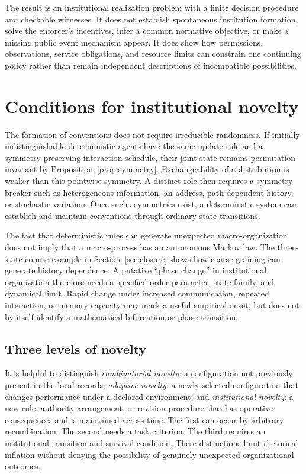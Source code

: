 \documentclass[11pt,letterpaper]{article}
\theoremstyle{plain}
\theoremstyle{definition}
\theoremstyle{remark}
\begin{document}
The result is an institutional realization problem with a finite decision procedure and checkable witnesses. It does not establish spontaneous institution formation, solve the enforcer's incentives, infer a common normative objective, or make a missing public event mechanism appear. It does show how permissions, observations, service obligations, and resource limits can constrain one continuing policy rather than remain independent descriptions of incompatible possibilities.
\FloatBarrier

\section{Conditions for institutional novelty}\label{sec:novelty}

The formation of conventions does not require irreducible randomness. If initially indistinguishable deterministic agents have the same update rule and a symmetry-preserving interaction schedule, their joint state remains permutation-invariant by Proposition~\ref{prop:symmetry}. Exchangeability of a distribution is weaker than this pointwise symmetry. A distinct role then requires a symmetry breaker such as heterogeneous information, an address, path-dependent history, or stochastic variation. Once such asymmetries exist, a deterministic system can establish and maintain conventions through ordinary state transitions.

The fact that deterministic rules can generate unexpected macro-organization does not imply that a macro-process has an autonomous Markov law. The three-state counterexample in Section~\ref{sec:closure} shows how coarse-graining can generate history dependence. A putative ``phase change'' in institutional organization therefore needs a specified order parameter, state family, and dynamical limit. Rapid change under increased communication, repeated interaction, or memory capacity may mark a useful empirical onset, but does not by itself identify a mathematical bifurcation or phase transition.

\subsection{Three levels of novelty}

It is helpful to distinguish \emph{combinatorial novelty}: a configuration not previously present in the local records; \emph{adaptive novelty}: a newly selected configuration that changes performance under a declared environment; and \emph{institutional novelty}: a new rule, authority arrangement, or revision procedure that has operative consequences and is maintained across time. The first can occur by arbitrary recombination. The second needs a task criterion. The third requires an institutional transition and survival condition. These distinctions limit rhetorical inflation without denying the possibility of genuinely unexpected organizational outcomes.
\end{document}
